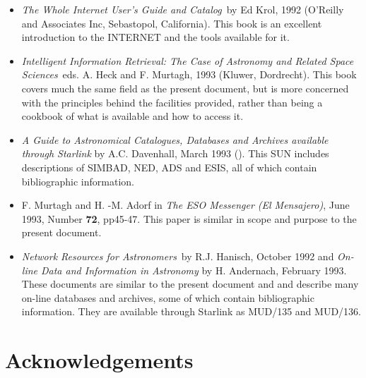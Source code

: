 \begin{itemize}

  \item {\it The Whole Internet User's Guide and
   Catalog}\, by Ed Krol, 1992 (O'Reilly and Associates Inc, 
   Sebastopol, California). This book is an excellent introduction to
   the INTERNET and the tools available for it.

  \item {\it Intelligent Information Retrieval: The Case of Astronomy
   and Related Space Sciences}\, eds. A. Heck and F. Murtagh, 1993
   (Kluwer, Dordrecht). This book covers much the same field as the 
   present document, but is more concerned with the principles behind
   the facilities provided, rather than being a cookbook of what is
   available and how to access it.

  \item {\it A Guide to Astronomical Catalogues, Databases and Archives
   available through Starlink} by A.C. Davenhall, March 1993
   ().
   This SUN includes descriptions of SIMBAD, NED, ADS and ESIS, all of 
   which contain bibliographic information.

  \item F. Murtagh and H. -M. Adorf in {\it The ESO Messenger (El 
   Mensajero)}, June 1993, Number {\bf 72}, pp45-47. This paper is
   similar in scope and purpose to the present document.

  \item {\it Network Resources for Astronomers}\, by R.J. Hanisch, 
   October 1992 and {\it On-line Data and Information in Astronomy} 
   by H. Andernach, February 1993. These documents are similar to the
   present document and  and describe many on-line
   databases and 
   archives, some of which contain bibliographic information. They are 
   available through Starlink as MUD/135 and MUD/136.

\end{itemize}


\section{Acknowledgements}


